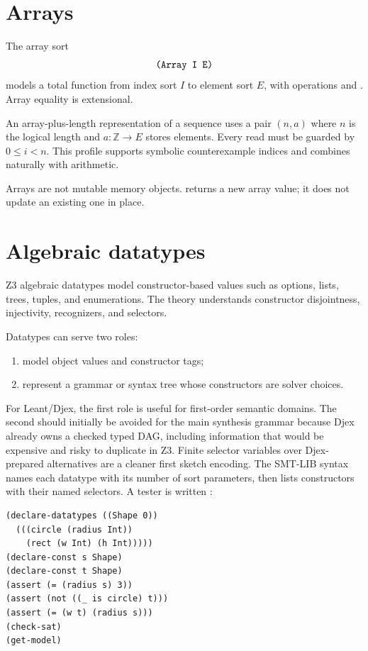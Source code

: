 \documentclass[10pt,letterpaper,oneside]{report}
\newcommand{\code}[1]{\texttt{\detokenize{#1}}}
\newcommand{\Int}{\mathbb{Z}}
\begin{document}
\section{Arrays}

The array sort
\[
  \code{(Array I E)}
\]
models a total function from index sort $I$ to element sort $E$, with operations \code{select} and \code{store}. Array equality is extensional.

An array-plus-length representation of a sequence uses a pair $(n,a)$ where $n$ is the logical length and $a:\Int\to E$ stores elements. Every read must be guarded by $0\le i<n$. This profile supports symbolic counterexample indices and combines naturally with arithmetic.

Arrays are not mutable memory objects. \code{store} returns a new array value; it does not update an existing one in place.

\section{Algebraic datatypes}

Z3 algebraic datatypes model constructor-based values such as options, lists, trees, tuples, and enumerations. The theory understands constructor disjointness, injectivity, recognizers, and selectors.

Datatypes can serve two roles:

\begin{enumerate}
\item model object values and constructor tags;
\item represent a grammar or syntax tree whose constructors are solver choices.
\end{enumerate}

For Leant/Djex, the first role is useful for first-order semantic domains. The second should initially be avoided for the main synthesis grammar because Djex already owns a checked typed DAG, including information that would be expensive and risky to duplicate in Z3. Finite selector variables over Djex-prepared alternatives are a cleaner first sketch encoding.
The SMT-LIB syntax names each datatype with its number of sort parameters, then lists constructors with their named selectors. A tester is written \code{(_ is C)}:

\begin{lstlisting}[language=SMTLib,caption={A two-constructor datatype with selectors and a tester.}]
(declare-datatypes ((Shape 0))
  (((circle (radius Int))
    (rect (w Int) (h Int)))))
(declare-const s Shape)
(declare-const t Shape)
(assert (= (radius s) 3))
(assert (not ((_ is circle) t)))
(assert (= (w t) (radius s)))
(check-sat)
(get-model)
\end{lstlisting}
\end{document}

